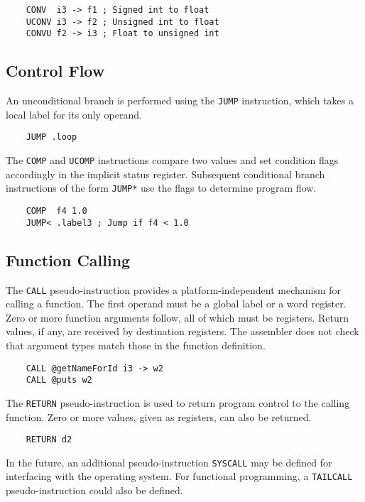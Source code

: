 \begin{verbatim}
    CONV  i3 -> f1 ; Signed int to float
    UCONV i3 -> f2 ; Unsigned int to float
    CONVU f2 -> i3 ; Float to unsigned int
\end{verbatim}

\subsection{Control Flow}

An unconditional branch is performed using the \texttt{JUMP} instruction, which
takes a local label for its only operand.

\begin{verbatim}
    JUMP .loop
\end{verbatim}

The \texttt{COMP} and \texttt{UCOMP} instructions compare two values and set condition flags
accordingly in the implicit status register. Subsequent conditional branch instructions of the
form \texttt{JUMP*} use the flags to determine program flow.

\begin{verbatim}
    COMP  f4 1.0
    JUMP< .label3 ; Jump if f4 < 1.0
\end{verbatim}

\subsection{Function Calling}

The \texttt{CALL} pseudo-instruction provides a platform-independent
mechanism for calling a function. The first operand must be
a global label or a word register. Zero or more function arguments follow,
all of which must be registers. Return values, if any, are received
by destination registers.
The assembler does not check that argument types match those
in the function definition.

\begin{verbatim}
    CALL @getNameForId i3 -> w2
    CALL @puts w2
\end{verbatim}

The \texttt{RETURN} pseudo-instruction is used to return program
control to the calling function. Zero or more values, given
as registers, can also be returned.

\begin{verbatim}
    RETURN d2
\end{verbatim}

In the future, an additional pseudo-instruction \texttt{SYSCALL}
may be defined for interfacing with the operating system.
For functional programming, a \texttt{TAILCALL} pseudo-instruction
could also be defined.


